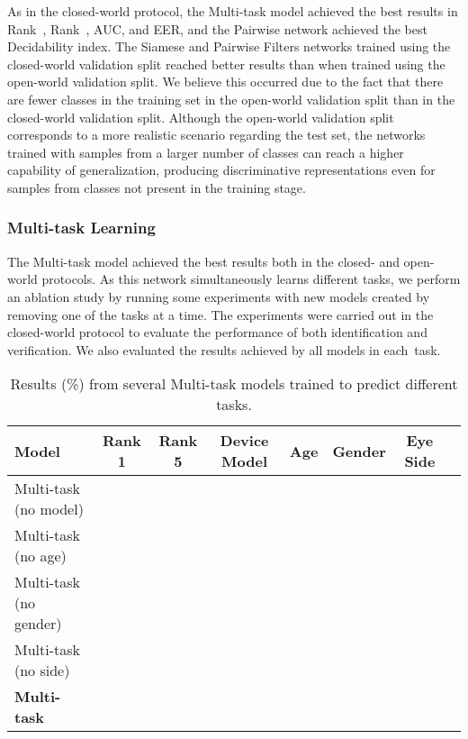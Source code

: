 \documentclass[journal]{IEEEtran}
\begin{document}
As in the closed-world protocol, the Multi-task model achieved the best results in Rank~, Rank~, AUC, and EER, and the Pairwise network achieved the best Decidability index.
The Siamese and Pairwise Filters networks trained using the closed-world validation split reached better results than when trained using the open-world validation split.
We believe this occurred due to the fact that there are fewer classes in the training set in the open-world validation split than in the closed-world validation split.
Although the open-world validation split corresponds to a more realistic scenario regarding the test set, the networks trained with samples from a larger number of classes can reach a higher capability of generalization, producing discriminative representations even for samples from classes not present in the training stage.

\subsubsection{Multi-task Learning}
\label{sec:multi}

The Multi-task model achieved the best results both in the closed- and open-world protocols.
As this network simultaneously learns different tasks, we perform an ablation study by running some experiments with  new models created by removing one of the tasks at a time.
The experiments were carried out in the closed-world protocol to evaluate the performance of both identification and verification.
We also evaluated the results achieved by all models in each~task.

\begin{table*}[!htb]
\centering
\caption{Results (\%) from several Multi-task models trained to predict different tasks.}
\label{tab:multitask}

\vspace{-1.5mm}

\begin{tabular}{@{}lccccccc@{}}
\toprule

Model                   & Rank 1     & Rank 5      & Device Model  & Age             & Gender          & Eye Side        \\


\midrule
Multi-task (no model)   &   &   &                &   &   & \boldmath{}  \\
Multi-task (no age)     &   &   &     &              &   & \boldmath{}  \\
Multi-task (no gender)  &   &   &     &   &              & \boldmath{}  \\
Multi-task (no side)    &   &   &     &   &   &              \\
\textbf{Multi-task}     & \boldmath{}  & \boldmath{}  & \boldmath{}    & \boldmath{}  & \boldmath{}  &   \\



\bottomrule
\end{tabular}
\end{table*}
\end{document}
